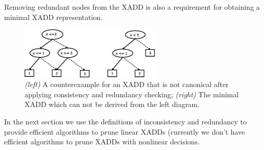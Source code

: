 \documentclass[twoside,11pt]{article}
\begin{document}
Removing redundant nodes from the XADD is also a requirement for obtaining a minimal XADD representation. 

\begin{figure}[t!]
\centering
\includegraphics[width=0.6\textwidth]{FiguresSource/counterExample.eps} 
\caption{%
{\it (left)} A counterexample for an XADD that is not canonical after applying consistency and redundancy checking; {\it (right)}  The minimal XADD which can not be derived from the left diagram.} %
\label{fig:canonical}
\end{figure}


In the next section we use the definitions of inconsistency and redundancy to provide efficient algorithms to prune linear XADDs (currently we don't have efficient algorithms to prune XADDs with nonlinear decisions. 

\end{document}
